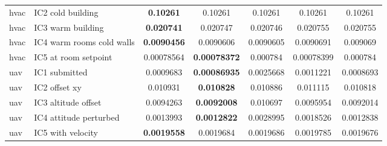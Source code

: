 \begin{table}[htbp]
{\begin{tabular}{@{}llccccc@{}}
hvac & IC2 cold building & \textbf{0.10261} & 0.10261 & 0.10261 & 0.10261 & 0.10261 \\
hvac & IC3 warm building & \textbf{0.020741} & 0.020747 & 0.020746 & 0.020755 & 0.020755 \\
hvac & IC4 warm rooms cold walls & \textbf{0.0090456} & 0.0090606 & 0.0090605 & 0.0090691 & 0.009069 \\
hvac & IC5 at room setpoint & 0.00078564 & \textbf{0.00078372} & 0.000784 & 0.00078399 & 0.000784 \\
uav & IC1 submitted & 0.0009683 & \textbf{0.00086935} & 0.0025668 & 0.0011221 & 0.0008693 \\
uav & IC2 offset xy & 0.010931 & \textbf{0.010828} & 0.010886 & 0.011115 & 0.010818 \\
uav & IC3 altitude offset & 0.0094263 & \textbf{0.0092008} & 0.010697 & 0.0095954 & 0.0092014 \\
uav & IC4 attitude perturbed & 0.0013993 & \textbf{0.0012822} & 0.0028995 & 0.0018526 & 0.0012838 \\
uav & IC5 with velocity & \textbf{0.0019558} & 0.0019684 & 0.0019686 & 0.0019785 & 0.0019676 \\
\bottomrule
\end{tabular}}
\end{table}
